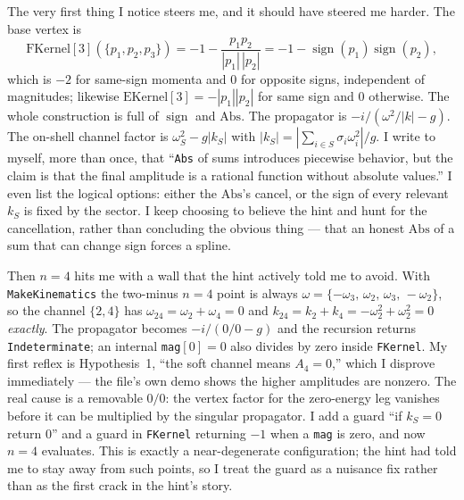 \documentclass{article}
\begin{document}
The very first thing I notice steers me, and it should have steered me harder. The
base vertex is
\[
\text{FKernel}[3](\{p_1,p_2,p_3\})
= -1-\frac{p_1p_2}{|p_1|\,|p_2|}
= -1-\operatorname{sign}(p_1)\operatorname{sign}(p_2),
\]
which is $-2$ for same-sign momenta and $0$ for opposite signs, independent of
magnitudes; likewise $\text{EKernel}[3]=-|p_1||p_2|$ for same sign and $0$
otherwise. The whole construction is full of $\operatorname{sign}$ and
$\mathrm{Abs}$. The propagator is $-i/(\omega^2/|k|-g)$. The on-shell channel
factor is $\omega_S^2-g|k_S|$ with $|k_S|=|\sum_{i\in S}\sigma_i\omega_i^2|/g$.
I write to myself, more than once, that ``\texttt{Abs} of sums introduces
piecewise behavior, but the claim is that the final amplitude is a rational
function without absolute values.'' I even list the logical options: either the
$\mathrm{Abs}$'s cancel, or the sign of every relevant $k_S$ is fixed by the
sector. I keep choosing to believe the hint and hunt for the cancellation, rather
than concluding the obvious thing --- that an honest $\mathrm{Abs}$ of a sum that
can change sign forces a spline.

Then $n=4$ hits me with a wall that the hint actively told me to avoid. With
\texttt{MakeKinematics} the two-minus $n=4$ point is always
$\omega=\{-\omega_3,\,\omega_2,\,\omega_3,\,-\omega_2\}$, so the channel
$\{2,4\}$ has $\omega_{24}=\omega_2+\omega_4=0$ and
$k_{24}=k_2+k_4=-\omega_2^2+\omega_2^2=0$ \emph{exactly}. The propagator becomes
$-i/(0/0-g)$ and the recursion returns \texttt{Indeterminate}; an internal
\texttt{mag}$[0]=0$ also divides by zero inside \texttt{FKernel}. My first
reflex is Hypothesis~1, ``the soft channel means $A_4=0$,'' which I disprove
immediately --- the file's own demo shows the higher amplitudes are nonzero. The
real cause is a removable $0/0$: the vertex factor for the zero-energy leg
vanishes before it can be multiplied by the singular propagator. I add a guard
``if $k_S=0$ return $0$'' and a guard in \texttt{FKernel} returning $-1$ when a
\texttt{mag} is zero, and now $n=4$ evaluates. This is exactly a near-degenerate
configuration; the hint had told me to stay away from such points, so I treat the
guard as a nuisance fix rather than as the first crack in the hint's story.
\end{document}
